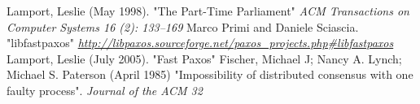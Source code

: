 \begin{thebibliography}{100} 
 Lamport, Leslie (May 1998). "The Part-Time Parliament" \emph{ ACM Transactions on Computer Systems 16 (2): 133–169}
 Marco Primi and Daniele Sciascia. "libfastpaxos" \emph{\url{http://libpaxos.sourceforge.net/paxos_projects.php\#libfastpaxos}}
 Lamport, Leslie (July 2005). "Fast Paxos" \emph{}
 Fischer, Michael J; Nancy A. Lynch; Michael S. Paterson (April 1985)  "Impossibility of distributed consensus with one faulty process". \emph{Journal of the ACM 32}
\end{thebibliography} 

